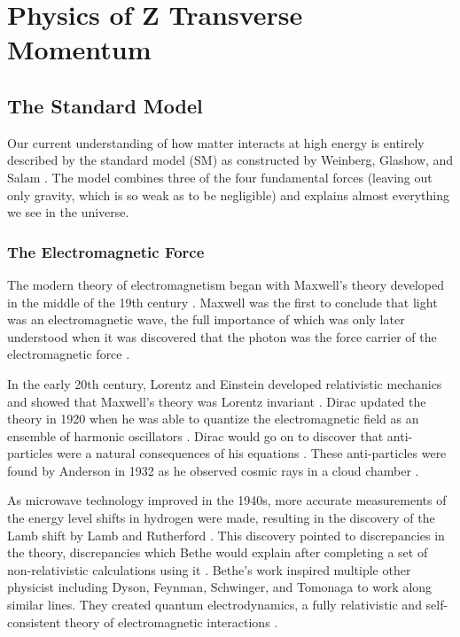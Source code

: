\chapter{Physics of Z Transverse Momentum}
\label{chapter:theory}

\section{The Standard Model}
\label{section:standard_model}

Our current understanding of how matter interacts at high energy is entirely
described by the standard model (SM) as constructed by Weinberg, Glashow, and
Salam \cite{glashow1961}\cite{weinberg1967}\cite{salam1968}. The model combines
three of the four fundamental forces (leaving out only gravity, which is so
weak as to be negligible) and explains almost everything we see in the
universe.

\subsection{The Electromagnetic Force}
\label{subsection:electronmagnetic_force}

The modern theory of electromagnetism began with Maxwell's theory developed in
the middle of the 19th century \cite{maxwell1863}. Maxwell was the first to
conclude that light was an electromagnetic wave, the full importance of which
was only later understood when it was discovered that the photon was the force
carrier of the electromagnetic force \cite{maxwell1865}.

In the early 20th century, Lorentz and Einstein developed relativistic
mechanics and showed that Maxwell's theory was Lorentz invariant
\cite{lorentz1899}\cite{einstein1904}. Dirac updated the theory in 1920 when he
was able to quantize the electromagnetic field as an ensemble of harmonic
oscillators \cite{dirac1927}. Dirac would go on to discover that anti-particles
were a natural consequences of his equations \cite{dirac1928}\cite{dirac1930}.
These anti-particles were found by Anderson in 1932 as he observed cosmic rays
in a cloud chamber \cite{anderson1933}.

As microwave technology improved in the 1940s, more accurate measurements of
the energy level shifts in hydrogen were made, resulting in the discovery of
the Lamb shift by Lamb and Rutherford \cite{lamb1947}. This discovery pointed
to discrepancies in the theory, discrepancies which Bethe would explain after
completing a set of non-relativistic calculations using it \cite{bethe1947}.
Bethe's work inspired multiple other physicist including Dyson, Feynman,
Schwinger, and Tomonaga to work along similar lines. They created quantum
electrodynamics, a fully relativistic and self-consistent theory of
electromagnetic interactions
\cite{tomonaga1946}\cite{schwinger1948}\cite{feynman1949}\cite{dyson1949}.

